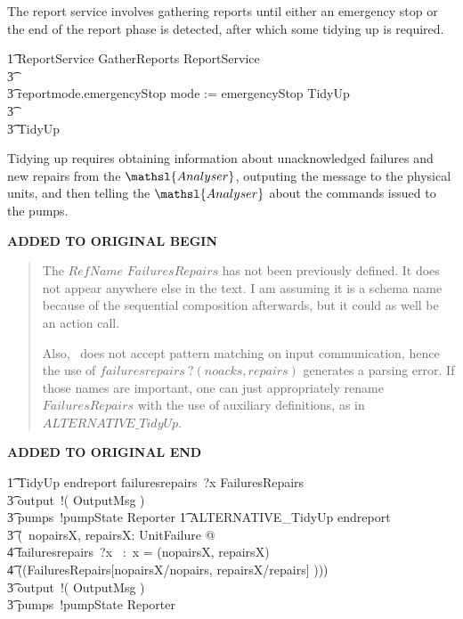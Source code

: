 \documentclass{report}
\newenvironment{addedstuff}{\begin{flushleft}\textbf{ADDED TO ORIGINAL BEGIN}\begin{quote}\begin{minipage}{.8\textwidth}}{\end{minipage}\end{quote}\textbf{ADDED TO ORIGINAL END}\end{flushleft}}
\newcommand{\lschexpract}{\left(\!\!\left(}
\newcommand{\rschexpract}{\right)\!\!\right)}
\newcommand{\prefixcolon}{~:~}
\begin{document}
The report service involves gathering reports until either an
emergency stop or the end of the report phase is detected, after which
some tidying up is required.
\begin{circusaction}
    \t1 ReportService \circdef GatherReports \circseq ReportService
        \\
        \t3 \extchoice  %
        \\ %
        \t3 reportmode.emergencyStop \then mode := emergencyStop \circseq TidyUp
        \\ %
        \t3 \extchoice %
        \\ %
        \t3 TidyUp
\end{circusaction}
Tidying up requires obtaining information about unacknowledged
failures and new repairs from the \( \mathsl{Analyser}\), outputing
the message to the physical units, and then telling the \(
\mathsl{Analyser} \) about the commands issued to the pumps.
%
\begin{addedstuff}
   The $RefName$ $FailuresRepairs$ has not been previously defined.
   It does not appear anywhere else in the text. I am assuming it is
   a schema name because of the sequential composition afterwards, but
   it could as well be an action call.

   Also, \Circus\ does not accept pattern matching on input communication,
   hence the use of $failuresrepairs~?(noacks,repairs)$ generates a parsing error.
   If those names are important, one can just appropriately rename $FailuresRepairs$
   with the use of auxiliary definitions, as in $ALTERNATIVE\_TidyUp$.
\end{addedstuff}
%
\begin{circusaction}
    \t1 TidyUp \circdef endreport \then failuresrepairs~?x \then FailuresRepairs \circseq \\
        \t3 output~!( \theta OutputMsg ) \then \\
        \t3 pumps~!pumpState \then Reporter
    \also
    \t1 ALTERNATIVE\_TidyUp \circdef endreport \then \\
    \t3 (\circvar\ nopairsX, repairsX: \power UnitFailure @ \\
        \t4 failuresrepairs~?x \prefixcolon x = (nopairsX, repairsX) \then \\
        \t4 \lschexpract FailuresRepairs[nopairsX/nopairs, repairsX/repairs] \rschexpract ) \circseq \\
    \t3 output~!( \theta OutputMsg ) \then \\
    \t3 pumps~!pumpState \then Reporter
\end{circusaction}
\end{document}
